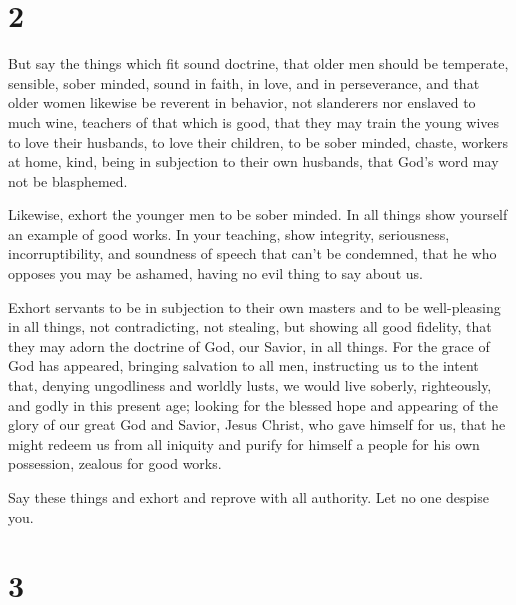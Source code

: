 \hypertarget{section-1}{%
\section{2}\label{section-1}}

 But say the things which fit sound doctrine,
 that older men should be temperate, sensible, sober
minded, sound in faith, in love, and in perseverance,  and
that older women likewise be reverent in behavior, not slanderers nor
enslaved to much wine, teachers of that which is good, 
that they may train the young wives to love their husbands, to love
their children,  to be sober minded, chaste, workers at
home, kind, being in subjection to their own husbands, that God's word
may not be blasphemed.

 Likewise, exhort the younger men to be sober minded.
 In all things show yourself an example of good works. In
your teaching, show integrity, seriousness, incorruptibility,
 and soundness of speech that can't be condemned, that he
who opposes you may be ashamed, having no evil thing to say about us.

 Exhort servants to be in subjection to their own masters
and to be well-pleasing in all things, not contradicting,
 not stealing, but showing all good fidelity, that they
may adorn the doctrine of God, our Savior, in all things.
 For the grace of God has appeared, bringing salvation to
all men,  instructing us to the intent that, denying
ungodliness and worldly lusts, we would live soberly, righteously, and
godly in this present age;  looking for the blessed hope
and appearing of the glory of our great God and Savior, Jesus Christ,
 who gave himself for us, that he might redeem us from
all iniquity and purify for himself a people for his own possession,
zealous for good works.

 Say these things and exhort and reprove with all
authority. Let no one despise you.

\hypertarget{section-2}{%
\section{3}\label{section-2}}

